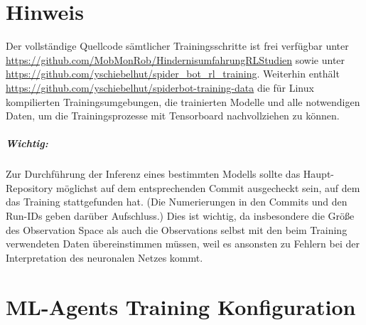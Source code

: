 \chapter{Hinweis}
Der vollständige Quellcode sämtlicher Trainingsschritte ist frei verfügbar unter \url{https://github.com/MobMonRob/HindernisumfahrungRLStudien} sowie unter \url{https://github.com/yschiebelhut/spider_bot_rl_training}.
Weiterhin enthält \url{https://github.com/yschiebelhut/spiderbot-training-data} die für Linux kompilierten Trainingsumgebungen, die trainierten Modelle und alle notwendigen Daten, um die Trainingsprozesse mit Tensorboard nachvollziehen zu können.

\paragraph{Wichtig:} Zur Durchführung der Inferenz eines bestimmten Modells sollte das Haupt-Repository möglichst auf dem entsprechenden Commit ausgecheckt sein, auf dem das Training stattgefunden hat.
(Die Numerierungen in den Commits und den Run-IDs geben darüber Aufschluss.)
Dies ist wichtig, da insbesondere die Größe des Observation Space als auch die Observations selbst mit den beim Training verwendeten Daten übereinstimmen müssen, weil es ansonsten zu Fehlern bei der Interpretation des neuronalen Netzes kommt.


\chapter{ML-Agents Training Konfiguration}
\label{anhang:trainer-config}
\begin{figure}[H]
    
\end{figure}